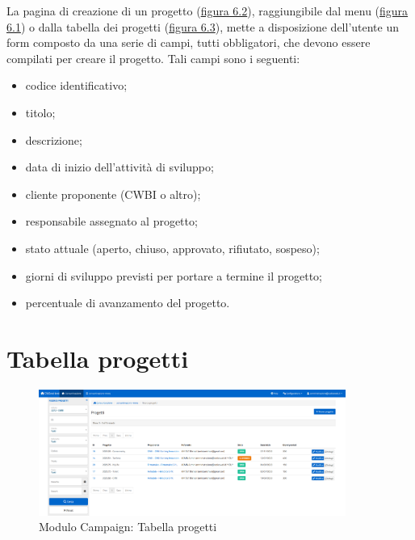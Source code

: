 \noindent La pagina di creazione di un progetto ({\hyperref[fig:nuovoProgetto]{figura 6.2}}), raggiungibile dal menu ({\hyperref[fig:menu]{figura 6.1}}) o dalla tabella dei progetti ({\hyperref[fig:tabellaProgetti]{figura 6.3}}), mette a disposizione dell'utente un form composto da una serie di campi, tutti obbligatori, che devono essere compilati per creare il progetto. Tali campi sono i seguenti:
\begin{itemize}
\item codice identificativo;
\item titolo;
\item descrizione;
\item data di inizio dell'attività di sviluppo;
\item cliente proponente (CWBI o altro);
\item responsabile assegnato al progetto;
\item stato attuale (aperto, chiuso, approvato, rifiutato, sospeso);
\item giorni di sviluppo previsti per portare a termine il progetto;
\item percentuale di avanzamento del progetto.
\end{itemize}

\pagebreak

\section{Tabella progetti}
\begin{figure}[!h]
\centering
\includegraphics[width=380px]{../images/UI/03-tabellaProgetti.png}
\caption{Modulo Campaign: Tabella progetti}
\label{fig:tabellaProgetti}
\end{figure}

